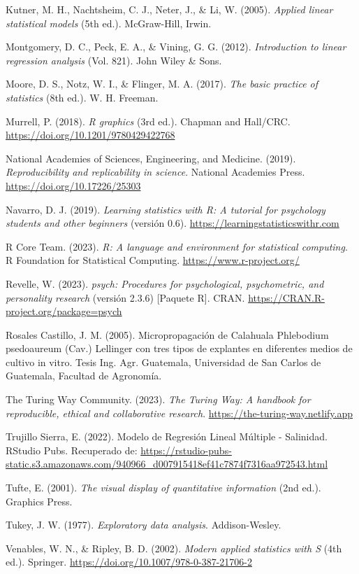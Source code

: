 \documentclass[
  spanish,
  a4paper,
  DIV=11,
  numbers=noendperiod,
  onepage,
  openany]{scrreprt}
\begin{document}
Kutner, M. H., Nachtsheim, C. J., Neter, J., \& Li, W. (2005).
\emph{Applied linear statistical models} (5th ed.). McGraw-Hill, Irwin.

Montgomery, D. C., Peck, E. A., \& Vining, G. G. (2012).
\emph{Introduction to linear regression analysis} (Vol. 821). John Wiley
\& Sons.

Moore, D. S., Notz, W. I., \& Flinger, M. A. (2017). \emph{The basic
practice of statistics} (8th ed.). W. H. Freeman.

Murrell, P. (2018). \emph{R graphics} (3rd ed.). Chapman and Hall/CRC.
\url{https://doi.org/10.1201/9780429422768}

National Academies of Sciences, Engineering, and Medicine. (2019).
\emph{Reproducibility and replicability in science}. National Academies
Press. \url{https://doi.org/10.17226/25303}

Navarro, D. J. (2019). \emph{Learning statistics with R: A tutorial for
psychology students and other beginners} (versión 0.6).
\url{https://learningstatisticswithr.com}

R Core Team. (2023). \emph{R: A language and environment for statistical
computing}. R Foundation for Statistical Computing.
\url{https://www.r-project.org/}

Revelle, W. (2023). \emph{psych: Procedures for psychological,
psychometric, and personality research} (versión 2.3.6) {[}Paquete R{]}.
CRAN. \url{https://CRAN.R-project.org/package=psych}

Rosales Castillo, J. M. (2005). Micropropagación de Calahuala Phlebodium
psedoaureum (Cav.) Lellinger con tres tipos de explantes en diferentes
medios de cultivo in vitro. Tesis Ing. Agr. Guatemala, Universidad de
San Carlos de Guatemala, Facultad de Agronomía.

The Turing Way Community. (2023). \emph{The Turing Way: A handbook for
reproducible, ethical and collaborative research}.
\url{https://the-turing-way.netlify.app}

Trujillo Sierra, E. (2022). Modelo de Regresión Lineal Múltiple -
Salinidad. RStudio Pubs. Recuperado de:
\url{https://rstudio-pubs-static.s3.amazonaws.com/940966_d007915418ef41c7874f7316aa972543.html}

Tufte, E. (2001). \emph{The visual display of quantitative information}
(2nd ed.). Graphics Press.

Tukey, J. W. (1977). \emph{Exploratory data analysis}. Addison-Wesley.

Venables, W. N., \& Ripley, B. D. (2002). \emph{Modern applied
statistics with S} (4th ed.). Springer.
\url{https://doi.org/10.1007/978-0-387-21706-2}
\end{document}
